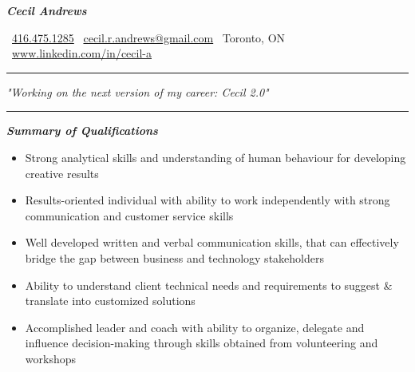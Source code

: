 \documentclass{article}
\begin{document}
\begin{center}
   
\Huge \textcolor{ablue}{\textit{\textbf{Cecil Andrews}}}

\end{center}

\begin{center}
 
\   \href{  tel:+1 416.475.1285}{416.475.1285} \textbar \  \href{mailto:cecil.r.andrews@gmail.com}{cecil.r.andrews@gmail.com}  \textbar  \ Toronto, ON   \textbar
\ \href{http://www.linkedin.com/in/cecil-a}{www.linkedin.com/in/cecil-a}

\end{center}


\noindent
{\color{ablue} \rule{\linewidth}{0.5mm} }
\begin{center}
\setmainfont{Calibri}
{\LARGE \textit{"Working on the next version of my career: Cecil 2.0"}}
\end{center}
\textnormal
\noindent
{\color{ablue} \rule{\linewidth}{0.5mm} }

\begin{center}
\large \textcolor{ablue}{\textit{\textbf{Summary of Qualifications}}}
\end{center}

\begin{flushleft}
\begin{itemize}
\item Strong analytical skills and understanding of human behaviour for developing creative results\\
\item Results-oriented individual with ability to work independently with strong communication and customer service skills \\
\item Well developed written and verbal communication skills, that can effectively bridge the gap between business and technology stakeholders \\
\item Ability to understand client technical needs and requirements to suggest \& translate into customized solutions\\
\item Accomplished leader and  coach with ability to organize, delegate and influence decision-making through skills obtained from volunteering and workshops
\end{itemize}
\end{flushleft}
\end{document}
